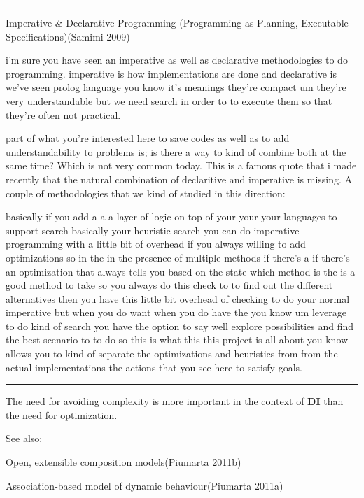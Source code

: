 \begin{center}\rule{0.5\linewidth}{0.5pt}\end{center}

Imperative \& Declarative Programming (Programming as Planning,
Executable Specifications)(Samimi 2009)

i'm sure you have seen an imperative as well as declarative
methodologies to do programming. imperative is how implementations are
done and declarative is we've seen prolog language you know it's
meanings they're compact um they're very understandable but we need
search in order to to execute them so that they're often not practical.

part of what you're interested here to save codes as well as to add
understandability to problems is; is there a way to kind of combine both
at the same time? Which is not very common today. This is a famous quote
that i made recently that the natural combination of declaritive and
imperative is missing. A couple of methodologies that we kind of studied
in this direction:

basically if you add a a a layer of logic on top of your your your
languages to support search basically your heuristic search you can do
imperative programming with a little bit of overhead if you always
willing to add optimizations so in the in the presence of multiple
methods if there's a if there's an optimization that always tells you
based on the state which method is the is a good method to take so you
always do this check to to find out the different alternatives then you
have this little bit overhead of checking to do your normal imperative
but when you do want when you do have the you know um leverage to do
kind of search you have the option to say well explore possibilities and
find the best scenario to to do so this is what this this project is all
about you know allows you to kind of separate the optimizations and
heuristics from from the actual implementations the actions that you see
here to satisfy goals.

\begin{center}\rule{0.5\linewidth}{0.5pt}\end{center}

The need for avoiding complexity is more important in the context of
\textbf{DI} than the need for optimization.

See also:

Open, extensible composition models(Piumarta 2011b)

Association-based model of dynamic behaviour(Piumarta 2011a)

